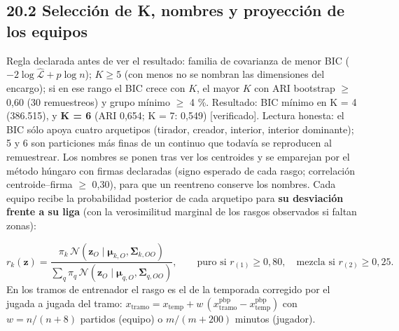\documentclass[10pt,a4paper]{article}
\begin{document}
\subsection*{20.2 Selección de K, nombres y proyección de los equipos}
Regla declarada antes de ver el resultado: familia de covarianza de menor BIC ($-2\log\hat{\mathcal L} + p\log n$); $K \ge 5$ (con menos no se nombran las dimensiones del encargo); si en ese rango el BIC crece con $K$, el mayor $K$ con ARI bootstrap \ensuremath{\geq} 0,60 (30 remuestreos) y grupo mínimo \ensuremath{\geq} 4 \%. Resultado: BIC mínimo en K = 4 (386.515), y \textbf{K = 6} (ARI 0,654; K = 7: 0,549) [verificado]. Lectura honesta: el BIC sólo apoya cuatro arquetipos (tirador, creador, interior, interior dominante); 5 y 6 son particiones más finas de un continuo que todavía se reproducen al remuestrear. Los nombres se ponen tras ver los centroides y se emparejan por el método húngaro con firmas declaradas (signo esperado de cada rasgo; correlación centroide--firma \ensuremath{\geq} 0,30), para que un reentreno conserve los nombres. Cada equipo recibe la probabilidad posterior de cada arquetipo para \textbf{su desviación frente a su liga} (con la verosimilitud marginal de los rasgos observados si faltan zonas):

\[
r_k(\mathbf z) = \frac{\pi_k\,\mathcal N(\mathbf z_O \mid \boldsymbol\mu_{k,O}, \boldsymbol\Sigma_{k,OO})}{\sum_q \pi_q\,\mathcal N(\mathbf z_O \mid \boldsymbol\mu_{q,O}, \boldsymbol\Sigma_{q,OO})}, \qquad \text{puro si } r_{(1)} \ge 0{,}80, \quad \text{mezcla si } r_{(2)} \ge 0{,}25 .
\]
En los tramos de entrenador el rasgo es el de la temporada corregido por el jugada a jugada del tramo: $x_{\mathrm{tramo}} = x_{\mathrm{temp}} + w\,(x^{\mathrm{pbp}}_{\mathrm{tramo}} - x^{\mathrm{pbp}}_{\mathrm{temp}})$ con $w = n/(n+8)$ partidos (equipo) o $m/(m+200)$ minutos (jugador).
\end{document}
